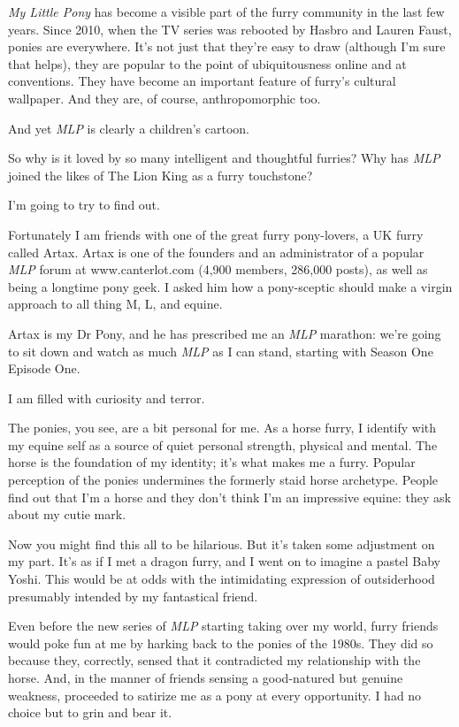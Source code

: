 
\textit{My Little Pony} has become a visible part of the furry community in the last few years. Since 2010, when the TV series was rebooted by Hasbro and Lauren Faust, ponies are everywhere. It’s not just that they’re easy to draw (although I’m sure that helps), they are popular to the point of ubiquitousness online and at conventions. They have become an important feature of furry’s cultural wallpaper. And they are, of course, anthropomorphic too.

And yet \textit{MLP} is clearly a children’s cartoon.

So why is it loved by so many intelligent and thoughtful furries? Why has \textit{MLP} joined the likes of The Lion King as a furry touchstone?

I’m going to try to find out.

Fortunately I am friends with one of the great furry pony-lovers, a UK furry called Artax. Artax is one of the founders and an administrator of a popular \textit{MLP} forum at www.canterlot.com (4,900 members, 286,000 posts), as well as being a longtime pony geek. I asked him how a pony-sceptic should make a virgin approach to all thing M, L, and equine.

Artax is my Dr Pony, and he has prescribed me an \textit{MLP} marathon: we’re going to sit down and watch as much \textit{MLP} as I can stand, starting with Season One Episode One.

I am filled with curiosity and terror.

The ponies, you see, are a bit personal for me. As a horse furry, I identify with my equine self as a source of quiet personal strength, physical and mental. The horse is the foundation of my identity; it’s what makes me a furry. Popular perception of the ponies undermines the formerly staid horse archetype. People find out that I’m a horse and they don’t think I’m an impressive equine: they ask about my cutie mark.

Now you might find this all to be hilarious. But it’s taken some adjustment on my part. It’s as if I met a dragon furry, and I went on to imagine a pastel Baby Yoshi. This would be at odds with the intimidating expression of outsiderhood presumably intended by my fantastical friend.

Even before the new series of \textit{MLP} starting taking over my world, furry friends would poke fun at me by harking back to the ponies of the 1980s. They did so because they, correctly, sensed that it contradicted my relationship with the horse. And, in the manner of friends sensing a good-natured but genuine weakness, proceeded to satirize me as a pony at every opportunity. I had no choice but to grin and bear it.

